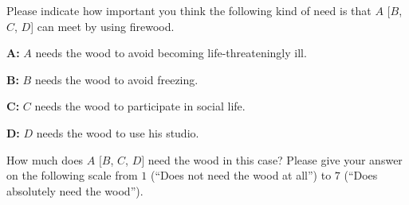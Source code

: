 \documentclass[10pt,letterpaper]{article}
\begin{document}
\noindent Please indicate how important you think the following kind of need is that $A$ [$B$, $C$, $D$] can meet by using firewood.\vspace{2ex}

\noindent\textbf{A:} $A$ needs the wood to avoid becoming life-threateningly ill.\vspace{2ex}

\noindent\textbf{B:} $B$ needs the wood to avoid freezing.\vspace{2ex}

\noindent\textbf{C:} $C$ needs the wood to participate in social life.\vspace{2ex}

\noindent\textbf{D:} $D$ needs the wood to use his studio.\vspace{2ex}

\noindent How much does $A$ $[B$, $C$, $D]$ need the wood in this case?
Please give your answer on the following scale from $1$ (``Does not need the wood at all'') to $7$ (``Does absolutely need the wood'').
\end{document}
